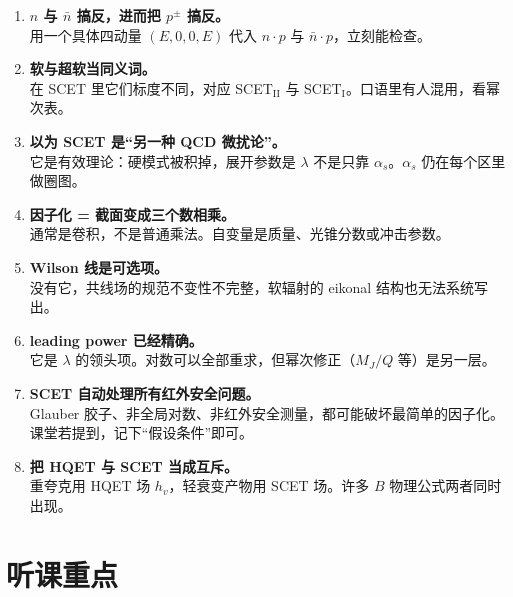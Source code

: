 \documentclass[11pt,a4paper]{article}
\theoremstyle{definition}
\theoremstyle{plain}
\theoremstyle{remark}
\begin{document}
\begin{enumerate}[leftmargin=1.8em]
  \item \textbf{$n$ 与 $\bar n$ 搞反，进而把 $p^\pm$ 搞反。}\\
  用一个具体四动量 $(E,0,0,E)$ 代入 $n\cdot p$ 与 $\bar n\cdot p$，立刻能检查。

  \item \textbf{软与超软当同义词。}\\
  在 SCET 里它们标度不同，对应 SCET$_{\mathrm{II}}$ 与 SCET$_{\mathrm I}$。口语里有人混用，看幂次表。

  \item \textbf{以为 SCET 是``另一种 QCD 微扰论''。}\\
  它是有效理论：硬模式被积掉，展开参数是 $\lambda$ 不是只靠 $\alpha_s$。$\alpha_s$ 仍在每个区里做圈图。

  \item \textbf{因子化 = 截面变成三个数相乘。}\\
  通常是卷积，不是普通乘法。自变量是质量、光锥分数或冲击参数。

  \item \textbf{Wilson 线是可选项。}\\
  没有它，共线场的规范不变性不完整，软辐射的 eikonal 结构也无法系统写出。

  \item \textbf{leading power 已经精确。}\\
  它是 $\lambda$ 的领头项。对数可以全部重求，但幂次修正（$M_J/Q$ 等）是另一层。

  \item \textbf{SCET 自动处理所有红外安全问题。}\\
  Glauber 胶子、非全局对数、非红外安全测量，都可能破坏最简单的因子化。课堂若提到，记下``假设条件''即可。

  \item \textbf{把 HQET 与 SCET 当成互斥。}\\
  重夸克用 HQET 场 $h_v$，轻衰变产物用 SCET 场。许多 $B$ 物理公式两者同时出现。
\end{enumerate}

\section{听课重点}
\label{sec:listen}
\end{document}
